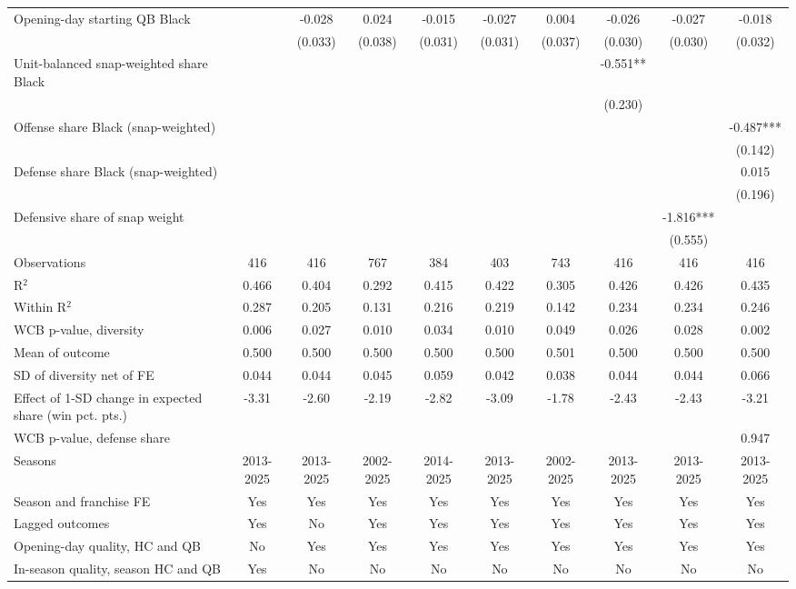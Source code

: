 \begin{table}[!h]
{\begin{threeparttable}
\begin{tabular}[t]{lccccccccc}
Opening-day starting QB Black &  & -0.028 & 0.024 & -0.015 & -0.027 & 0.004 & -0.026 & -0.027 & -0.018\\
 &  & (0.033) & (0.038) & (0.031) & (0.031) & (0.037) & (0.030) & (0.030) & (0.032)\\
Unit-balanced snap-weighted share Black &  &  &  &  &  &  & -0.551** &  & \\
 &  &  &  &  &  &  & (0.230) &  & \\
Offense share Black (snap-weighted) &  &  &  &  &  &  &  &  & -0.487***\\
 &  &  &  &  &  &  &  &  & (0.142)\\
Defense share Black (snap-weighted) &  &  &  &  &  &  &  &  & 0.015\\
 &  &  &  &  &  &  &  &  & (0.196)\\
Defensive share of snap weight &  &  &  &  &  &  &  & -1.816*** & \\
 &  &  &  &  &  &  &  & (0.555) & \\
\midrule
Observations & 416 & 416 & 767 & 384 & 403 & 743 & 416 & 416 & 416\\
R$^2$ & 0.466 & 0.404 & 0.292 & 0.415 & 0.422 & 0.305 & 0.426 & 0.426 & 0.435\\
Within R$^2$ & 0.287 & 0.205 & 0.131 & 0.216 & 0.219 & 0.142 & 0.234 & 0.234 & 0.246\\
WCB p-value, diversity & 0.006 & 0.027 & 0.010 & 0.034 & 0.010 & 0.049 & 0.026 & 0.028 & 0.002\\
Mean of outcome & 0.500 & 0.500 & 0.500 & 0.500 & 0.500 & 0.501 & 0.500 & 0.500 & 0.500\\
SD of diversity net of FE & 0.044 & 0.044 & 0.045 & 0.059 & 0.042 & 0.038 & 0.044 & 0.044 & 0.066\\
Effect of 1-SD change in expected share (win pct. pts.) & -3.31 & -2.60 & -2.19 & -2.82 & -3.09 & -1.78 & -2.43 & -2.43 & -3.21\\
WCB p-value, defense share &  &  &  &  &  &  &  &  & 0.947\\
Seasons & 2013-2025 & 2013-2025 & 2002-2025 & 2014-2025 & 2013-2025 & 2002-2025 & 2013-2025 & 2013-2025 & 2013-2025\\
Season and franchise FE & Yes & Yes & Yes & Yes & Yes & Yes & Yes & Yes & Yes\\
Lagged outcomes & Yes & No & Yes & Yes & Yes & Yes & Yes & Yes & Yes\\
Opening-day quality, HC and QB & No & Yes & Yes & Yes & Yes & Yes & Yes & Yes & Yes\\
In-season quality, season HC and QB & Yes & No & No & No & No & No & No & No & No\\

\end{tabular}
\end{threeparttable}}
\end{table}
